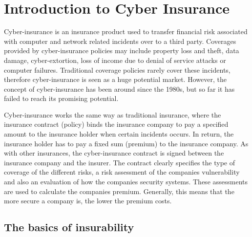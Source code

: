 \chapter{Introduction to Cyber Insurance}
\label{chp:introductionToCyberInsurance} 

Cyber-insurance is an insurance product used to transfer financial risk
associated with computer and network related incidents over to a third party.
 Coverages provided by cyber-insurance policies may include property loss and
theft, data damage, cyber-extortion, loss of income due to denial of service attacks or computer failures. \cite{washingtonpaper}
Traditional coverage policies rarely cover these incidents, therefore cyber-insurance is seen as a huge potential market. However, the concept of cyber-insurance has been around since the 1980s, but so far it has failed to reach its promising potential. 
  
 
Cyber-insurance works the same way as traditional insurance, where the insurance contract (policy) binds the insurance company to pay a specified amount to the insurance holder when certain incidents occurs. In return, the insurance holder has to pay a fixed sum (premium) to the insurance company. \cite{robinson2012incentives}
    As with other insurances, the cyber-insurance contract is signed between the insurance company and the insurer. The contract clearly specifies the type of coverage of the different risks, a risk assessment of the companies vulnerability and also an evaluation of how the companies security systems. These assessments are used to calculate the companies premium. \cite{robinson2012incentives} Generally, this means that the more secure a company is, the lower the premium costs.  

\section{The basics of insurability}

